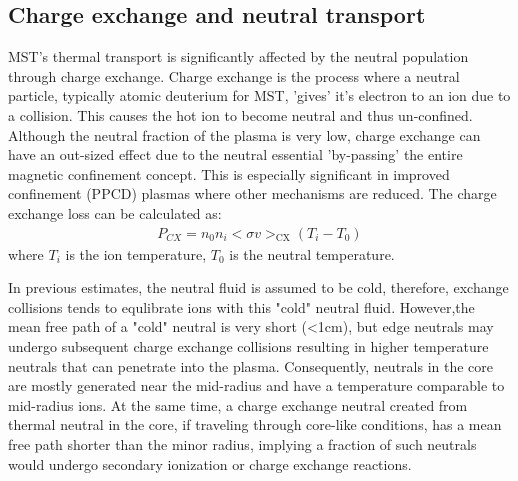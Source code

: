 \begin{refsection}
\subsection{Charge exchange and neutral transport}\label{sec:neutral_physics}

MST's thermal transport is significantly affected by the neutral population through charge exchange. Charge exchange is the process where a neutral particle, typically atomic deuterium for MST, 'gives' it's electron to an ion due to a collision. This causes the hot ion to become neutral and thus un-confined. Although the neutral fraction of the plasma is very low, charge exchange can have an out-sized effect due to the neutral essential 'by-passing' the entire magnetic confinement concept. This is especially significant in improved confinement (PPCD) plasmas where other mechanisms are reduced. The charge exchange loss can be calculated as:
\begin{align}
    P_{CX} = n_0 n_i <\sigma v>_\text{CX} (T_i - T_0)
\end{align}
where $T_i$ is the ion temperature, $T_{0}$ is the neutral temperature.

In previous estimates, the neutral fluid is assumed to be cold, therefore, exchange collisions tends to equlibrate ions with this "cold" neutral fluid. However,the mean free path of a "cold" neutral is
very short (<1cm), but edge neutrals may undergo subsequent charge exchange collisions resulting in higher temperature neutrals that can penetrate into the plasma. Consequently, neutrals in the core are mostly generated near the mid-radius and have a temperature comparable to mid-radius ions. At the same time, a charge exchange neutral created from thermal neutral in the core, if traveling through core-like conditions, has a mean free path
shorter than the minor radius, implying a fraction of such neutrals would undergo secondary ionization or charge exchange reactions. 


\end{refsection}
